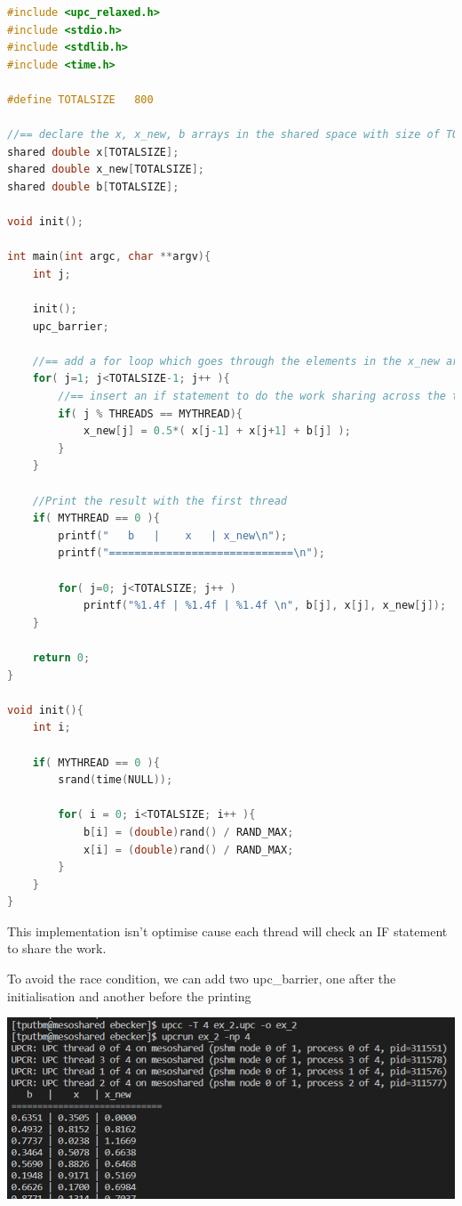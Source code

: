 \documentclass{report}
\begin{document}
\begin{lstlisting}[language=C]
#include <upc_relaxed.h>
#include <stdio.h>
#include <stdlib.h>
#include <time.h>

#define TOTALSIZE 	800

//== declare the x, x_new, b arrays in the shared space with size of TOTALSIZE
shared double x[TOTALSIZE];
shared double x_new[TOTALSIZE];
shared double b[TOTALSIZE];

void init();

int main(int argc, char **argv){
    int j;

    init();
    upc_barrier;

    //== add a for loop which goes through the elements in the x_new array
    for( j=1; j<TOTALSIZE-1; j++ ){
        //== insert an if statement to do the work sharing across the threads
        if( j % THREADS == MYTHREAD){
            x_new[j] = 0.5*( x[j-1] + x[j+1] + b[j] );
        }
    }

    //Print the result with the first thread
    if( MYTHREAD == 0 ){
        printf("   b   |    x   | x_new\n");
        printf("=============================\n");

        for( j=0; j<TOTALSIZE; j++ )
            printf("%1.4f | %1.4f | %1.4f \n", b[j], x[j], x_new[j]);
    }

    return 0;
}

void init(){
    int i;

    if( MYTHREAD == 0 ){
        srand(time(NULL));

        for( i = 0; i<TOTALSIZE; i++ ){
            b[i] = (double)rand() / RAND_MAX;
            x[i] = (double)rand() / RAND_MAX;
        }
    }
}

\end{lstlisting}

This implementation isn't optimise cause each thread will check an IF statement to share the work. 

To avoid the race condition, we can add two upc\_barrier, one after the initialisation and another before the printing

\begin{center}
    \includegraphics[scale=0.75]{Images/1rst_output.png}
    \label{fig3}
\end{center}
\end{document}
